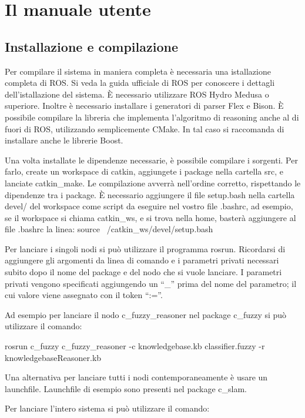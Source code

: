 \chapter{Il manuale utente}
\label{app:manuale}
\thispagestyle{empty}

\section{Installazione e compilazione}

Per compilare il sistema in maniera completa è necessaria una istallazione completa di ROS. Si veda la guida ufficiale di ROS per conoscere i dettagli dell'istallazione del sistema. \`E necessario utilizzare ROS Hydro Medusa o superiore.  %
Inoltre è necessario installare i generatori di parser Flex e Bison.
\`E possibile compilare la libreria che implementa l'algoritmo di reasoning anche al di fuori di ROS, utilizzando semplicemente CMake. In tal caso si raccomanda di installare anche le librerie Boost.

Una volta installate le dipendenze necessarie, è possibile compilare i sorgenti. Per farlo, create un workspace di catkin, aggiungete i package nella cartella src, e lanciate catkin\_make. Le compilazione avverrà nell'ordine corretto, rispettando le dipendenze tra i package.
\`E necessario aggiungere il file setup.bash nella cartella devel/ del workspace come script da eseguire nel vostro file .bashrc, ad esempio, se il workspace  si chiama catkin\_ws, e si trova nella home, basterà aggiungere al file .bashrc la linea:
source ~/catkin\_ws/devel/setup.bash

Per lanciare i singoli nodi si può utilizzare il programma rosrun. Ricordarsi di aggiungere gli argomenti da linea di comando e i parametri privati necessari subito dopo il nome del package e del nodo che si vuole lanciare. 
I parametri privati vengono specificati aggiungendo un ``\_'' prima del nome del parametro; il cui valore viene assegnato con il token ``:=''.

Ad esempio per lanciare il nodo c\_fuzzy\_reasoner nel package c\_fuzzy si può utilizzare il comando:

rosrun c\_fuzzy c\_fuzzy\_reasoner -c knowledgebase.kb classifier.fuzzy -r knowledgebaseReasoner.kb

Una alternativa per lanciare tutti i nodi contemporaneamente è usare un launchfile. Launchfile di esempio sono presenti nel package c\_slam.

Per lanciare l'intero sistema si può utilizzare il comando:

